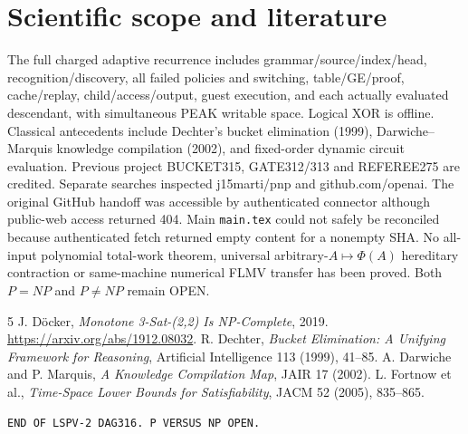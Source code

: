 \documentclass[11pt]{article}
\begin{document}
\section{Scientific scope and literature}
The full charged adaptive recurrence includes grammar/source/index/head, recognition/discovery, all failed policies and switching, table/GE/proof, cache/replay, child/access/output, guest execution, and each actually evaluated descendant, with simultaneous PEAK writable space. Logical XOR is offline. Classical antecedents include Dechter's bucket elimination (1999), Darwiche--Marquis knowledge compilation (2002), and fixed-order dynamic circuit evaluation. Previous project BUCKET315, GATE312/313 and REFEREE275 are credited. Separate searches inspected j15marti/pnp and github.com/openai. The original GitHub handoff was accessible by authenticated connector although public-web access returned 404. Main \texttt{main.tex} could not safely be reconciled because authenticated fetch returned empty content for a nonempty SHA.
No all-input polynomial total-work theorem, universal arbitrary-$A\mapsto\Phi(A)$ hereditary contraction or same-machine numerical FLMV transfer has been proved. Both $P=NP$ and $P\ne NP$ remain OPEN.
\begin{thebibliography}{5}
 J. D\"ocker, \emph{Monotone 3-Sat-(2,2) Is NP-Complete}, 2019. \url{https://arxiv.org/abs/1912.08032}.
 R. Dechter, \emph{Bucket Elimination: A Unifying Framework for Reasoning}, Artificial Intelligence 113 (1999), 41--85.
 A. Darwiche and P. Marquis, \emph{A Knowledge Compilation Map}, JAIR 17 (2002).
 L. Fortnow et al., \emph{Time-Space Lower Bounds for Satisfiability}, JACM 52 (2005), 835--865.
\end{thebibliography}
\noindent\texttt{END OF LSPV-2 DAG316. P VERSUS NP OPEN.}
\end{document}
